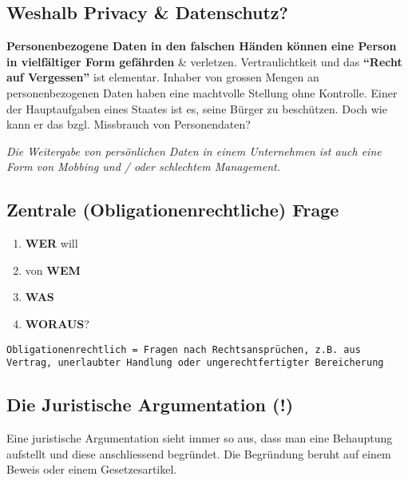 \hypertarget{weshalb-privacy-datenschutz}{%
\subsection{Weshalb Privacy \&
Datenschutz?}\label{weshalb-privacy-datenschutz}}

\textbf{Personenbezogene Daten in den falschen Händen können eine Person
in vielfältiger Form gefährden} \& verletzen. Vertraulichtkeit und das
\textbf{``Recht auf Vergessen''} ist elementar. Inhaber von grossen
Mengen an personenbezogenen Daten haben eine machtvolle Stellung ohne
Kontrolle. Einer der Hauptaufgaben eines Staates ist es, seine Bürger zu
beschützen. Doch wie kann er das bzgl. Missbrauch von Personendaten?

\emph{Die Weitergabe von persönlichen Daten in einem Unternehmen ist
auch eine Form von Mobbing und / oder schlechtem Management.}

\hypertarget{zentrale-obligationenrechtliche-frage}{%
\subsection{Zentrale (Obligationenrechtliche)
Frage}\label{zentrale-obligationenrechtliche-frage}}

\begin{enumerate}
\def\labelenumi{\arabic{enumi})}
\tightlist
\item
  \textbf{WER} will
\item
  von \textbf{WEM}
\item
  \textbf{WAS}
\item
  \textbf{WORAUS}?
\end{enumerate}

\begin{verbatim}
Obligationenrechtlich = Fragen nach Rechtsansprüchen, z.B. aus Vertrag, unerlaubter Handlung oder ungerechtfertigter Bereicherung
\end{verbatim}

\hypertarget{die-juristische-argumentation}{%
\subsection{Die Juristische Argumentation
(!)}\label{die-juristische-argumentation}}

Eine juristische Argumentation sieht immer so aus, dass man eine
Behauptung aufstellt und diese anschliessend begründet. Die Begründung
beruht auf einem Beweis oder einem Gesetzesartikel.


